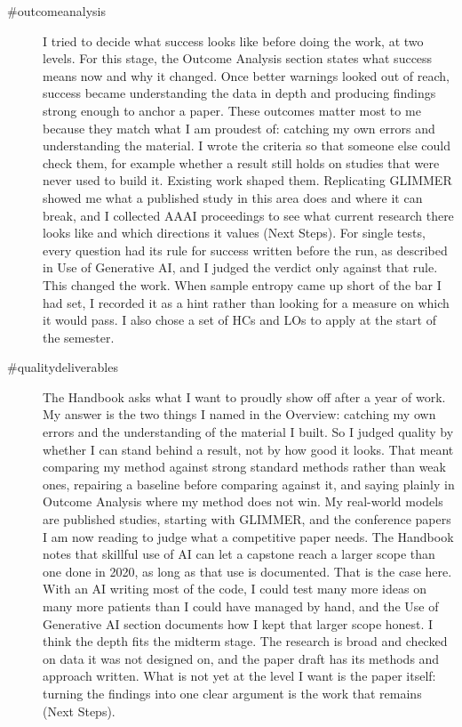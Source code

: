 \begin{description}
\item[\#outcomeanalysis] I tried to decide what success looks like before doing the work, at two levels. For this stage, the Outcome Analysis section states what success means now and why it changed. Once better warnings looked out of reach, success became understanding the data in depth and producing findings strong enough to anchor a paper. These outcomes matter most to me because they match what I am proudest of: catching my own errors and understanding the material. I wrote the criteria so that someone else could check them, for example whether a result still holds on studies that were never used to build it. Existing work shaped them. Replicating GLIMMER showed me what a published study in this area does and where it can break, and I collected AAAI proceedings to see what current research there looks like and which directions it values (Next Steps). For single tests, every question had its rule for success written before the run, as described in Use of Generative AI, and I judged the verdict only against that rule. This changed the work. When sample entropy came up short of the bar I had set, I recorded it as a hint rather than looking for a measure on which it would pass. I also chose a set of HCs and LOs to apply at the start of the semester. 

\item[\#qualitydeliverables] The Handbook asks what I want to proudly show off after a year of work. My answer is the two things I named in the Overview: catching my own errors and the understanding of the material I built. So I judged quality by whether I can stand behind a result, not by how good it looks. That meant comparing my method against strong standard methods rather than weak ones, repairing a baseline before comparing against it, and saying plainly in Outcome Analysis where my method does not win. My real-world models are published studies, starting with GLIMMER, and the conference papers I am now reading to judge what a competitive paper needs. The Handbook notes that skillful use of AI can let a capstone reach a larger scope than one done in 2020, as long as that use is documented. That is the case here. With an AI writing most of the code, I could test many more ideas on many more patients than I could have managed by hand, and the Use of Generative AI section documents how I kept that larger scope honest. I think the depth fits the midterm stage. The research is broad and checked on data it was not designed on, and the paper draft has its methods and approach written. What is not yet at the level I want is the paper itself: turning the findings into one clear argument is the work that remains (Next Steps).


\end{description}
